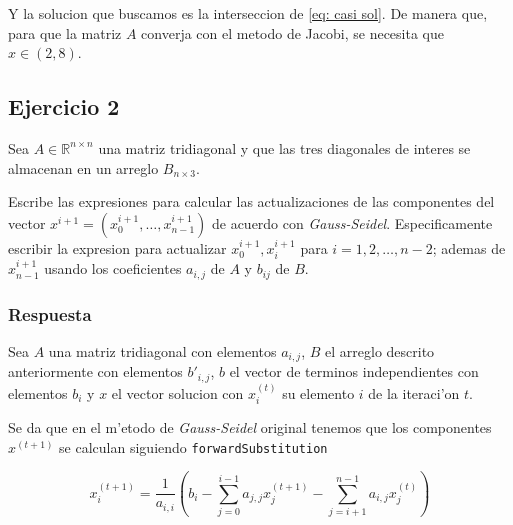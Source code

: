 \documentclass[11pt]{article}
\begin{document}
Y la solucion que buscamos es la interseccion de \ref{eq: casi sol}. De
manera que, para que la matriz \(A\) converja con el metodo de Jacobi,
se necesita que \(x \in (2,8)\).




















\newpage
    \hypertarget{ejercicio-2}{%
\subsection{Ejercicio 2}\label{ejercicio-2}}

    Sea \(A \in \mathbb R^{n\times n}\) una matriz tridiagonal y que las
tres diagonales de interes se almacenan en un arreglo
\(B_{n \times 3}\).

Escribe las expresiones para calcular las actualizaciones de las
componentes del vector
\(x^{i+1} = \left( x^{i+1}_0, \dots, x^{i+1}_{n-1} \right)\) de acuerdo
con \textit{Gauss-Seidel}. Especificamente escribir la expresion para
actualizar \(x^{i+1}_0, x^{i+1}_i\) para \(i = 1,2,\dots, n-2\); ademas
de \(x^{i+1}_{n-1}\) usando los coeficientes \(a_{i,j}\) de \(A\) y
\(b_{ij}\) de \(B\).

    \hypertarget{respuesta}{%
\subsubsection{Respuesta}\label{respuesta}}

    \par

Sea \(A\) una matriz tridiagonal con elementos \(a_{i,j}\), \(B\) el
arreglo descrito anteriormente con elementos \(b'_{i,j}\), \(b\) el
vector de terminos independientes con elementos \(b_i\) y \(x\) el
vector solucion con \(x_i^{(t)}\) su elemento \(i\) de la iteraci'on
\(t\).

\par

Se da que en el m'etodo de \textit{Gauss-Seidel} original tenemos que
los componentes \(x^{(t+1)}\) se calculan siguiendo
\verb|forwardSubstitution|

\begin{equation}
    x_{i}^{(t+1)} = \frac{1}{a_{i,i}}\left( b_i - \sum_{j=0}^{i-1} a_{j,j}x_{j}^{(t+1)} - \sum_{j=i+1}^{n-1} a_{i,j}x_j^{(t)}\right)
    \label{eq: GS original}
\end{equation}
\end{document}
